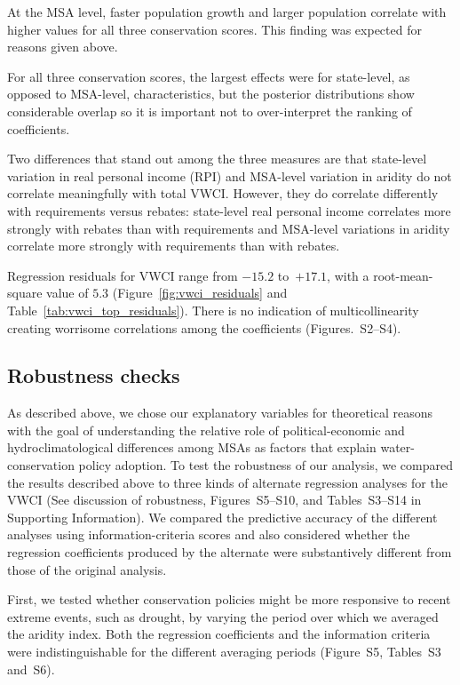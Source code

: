 \documentclass[draft,linenumbers]{agujournal}
\begin{document}
At the MSA level, faster population growth and larger population correlate with higher values
for all three conservation scores.
This finding was expected for reasons given above.
%
%


For all three conservation scores, the largest effects were for state-level,
as opposed to MSA-level, characteristics, but the posterior distributions show
considerable overlap so it is important not to over-interpret the ranking of
coefficients.

Two differences that stand out among the three measures are that state-level
variation in real personal income (RPI) and MSA-level variation in aridity
do not correlate meaningfully with
total VWCI. However, they do
correlate differently with
requirements versus rebates:
state-level real personal income
correlates more strongly with rebates
than with requirements
and MSA-level variations in aridity
correlate more strongly with requirements
than with rebates.

%
%

Regression residuals for VWCI range
from $-15.2$
to~$+17.1$,
with a root-mean-square value of
$5.3$
(Figure~\ref{fig:vwci_residuals} and Table~\ref{tab:vwci_top_residuals}).
There is no indication of multicollinearity creating worrisome correlations
among the coefficients (Figures.~S2--S4).
%
%

%
%



\subsection{Robustness checks}
As described above, we chose our explanatory variables
for theoretical reasons with the goal of understanding the relative role of political-economic
and hydroclimatological differences among MSAs as factors that explain water-conservation policy
adoption.
To test the robustness of our analysis,
we compared the results described above to three kinds of alternate regression
analyses for the VWCI
(See discussion of robustness, Figures~S5--S10, and Tables~S3--S14
in Supporting Information).
We compared the predictive accuracy of the different analyses using information-criteria scores
\citep{gelman:predictive:2014,vehtari:loo:2016}
and also considered whether the regression coefficients produced by the alternate were substantively
different from those of the original analysis.

First, we tested whether conservation policies might be more
responsive to recent extreme events, such as drought, by varying the
period over which we averaged the aridity index.
Both the regression coefficients and the information criteria were
indistinguishable for the different averaging periods
(Figure~S5, Tables~S3 and~S6).
\end{document}
